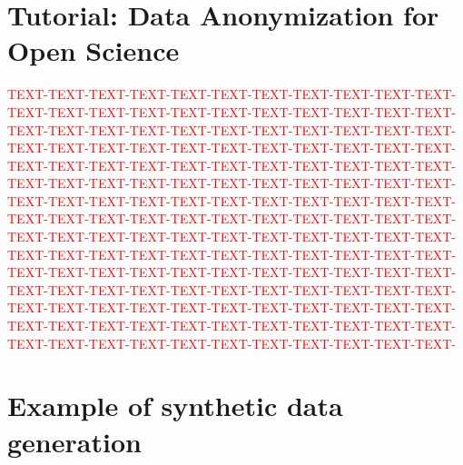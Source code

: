 \documentclass[a0,portrait]{a0poster}
\begin{document}
\begin{multicols}{3}
\section{Tutorial: Data Anonymization for Open Science}

\textcolor{red}{
TEXT-TEXT-TEXT-TEXT-TEXT-TEXT-TEXT-TEXT-TEXT-TEXT-TEXT-
TEXT-TEXT-TEXT-TEXT-TEXT-TEXT-TEXT-TEXT-TEXT-TEXT-TEXT-
TEXT-TEXT-TEXT-TEXT-TEXT-TEXT-TEXT-TEXT-TEXT-TEXT-TEXT-
TEXT-TEXT-TEXT-TEXT-TEXT-TEXT-TEXT-TEXT-TEXT-TEXT-TEXT-
TEXT-TEXT-TEXT-TEXT-TEXT-TEXT-TEXT-TEXT-TEXT-TEXT-TEXT-
TEXT-TEXT-TEXT-TEXT-TEXT-TEXT-TEXT-TEXT-TEXT-TEXT-TEXT-
TEXT-TEXT-TEXT-TEXT-TEXT-TEXT-TEXT-TEXT-TEXT-TEXT-TEXT-
TEXT-TEXT-TEXT-TEXT-TEXT-TEXT-TEXT-TEXT-TEXT-TEXT-TEXT-
TEXT-TEXT-TEXT-TEXT-TEXT-TEXT-TEXT-TEXT-TEXT-TEXT-TEXT-
TEXT-TEXT-TEXT-TEXT-TEXT-TEXT-TEXT-TEXT-TEXT-TEXT-TEXT-
TEXT-TEXT-TEXT-TEXT-TEXT-TEXT-TEXT-TEXT-TEXT-TEXT-TEXT-
TEXT-TEXT-TEXT-TEXT-TEXT-TEXT-TEXT-TEXT-TEXT-TEXT-TEXT-
TEXT-TEXT-TEXT-TEXT-TEXT-TEXT-TEXT-TEXT-TEXT-TEXT-TEXT-
TEXT-TEXT-TEXT-TEXT-TEXT-TEXT-TEXT-TEXT-TEXT-TEXT-TEXT-
TEXT-TEXT-TEXT-TEXT-TEXT-TEXT-TEXT-TEXT-TEXT-TEXT-TEXT-
} 


\section{Example of synthetic data generation}


\end{multicols}
\end{document}
